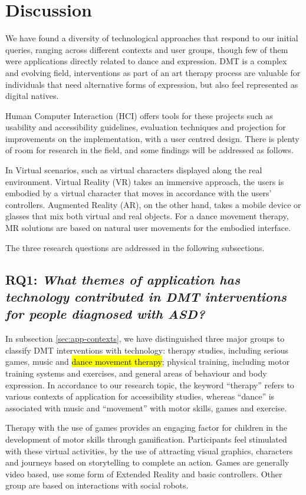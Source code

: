 \documentclass[a4paper,fleqn]{cas-sc}
\begin{document}
\section{Discussion} 
\label{sec5:discussion}
We have found a diversity of technological approaches that respond to our initial queries, ranging across different contexts and user groups, though few of them were applications directly related to dance and expression. DMT is a complex and evolving field, interventions as part of an art therapy process are valuable for individuals that need alternative forms of expression, but also feel represented as digital natives.

Human Computer Interaction (HCI) offers tools for these projects such as usability and accessibility guidelines, evaluation techniques and projection for improvements on the implementation, with a user centred design. There is plenty of room for research in the field, and some findings will be addressed as follows.

In Virtual scenarios, such as virtual characters displayed along the real environment. Virtual Reality (VR) takes an immersive approach, the users is embodied by a virtual character that moves in accordance with the users’ controllers. Augmented Reality (AR), on the other hand, takes a mobile device or glasses that mix both virtual and real objects. For a dance movement therapy, MR solutions are based on natural user movements for the embodied interface.

The three research questions are addressed in the following subsections.

\subsection{RQ1: \emph{What themes of application has technology contributed in DMT interventions for people diagnosed with ASD?}}

In subsection \ref{sec:app-contexts}, we have distinguished three major groups to classify DMT interventions with technology: therapy studies, including serious games, music and \hl{dance movement therapy}; physical training, including motor training systems and exercises, and general areas of behaviour and body expression.
In accordance to our research topic, the keyword ``therapy'' refers to various contexts of application for accessibility studies, whereas ``dance'' is associated with music and ``movement'' with motor skills, games and exercise.


Therapy with the use of games provides an engaging factor for children in the development of motor skills through gamification. Participants feel stimulated with these virtual activities, by the use of attracting visual graphics, characters and journeys based on storytelling to complete an action. Games are generally video based, use some form of Extended Reality and basic controllers. Other group are based on interactions with social robots.
\end{document}
